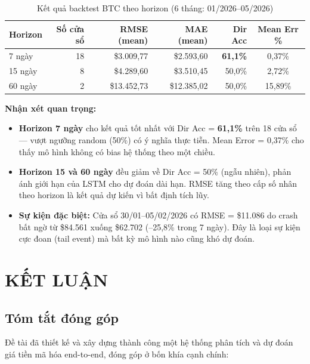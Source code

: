 \documentclass[12pt, a4paper]{report}
\begin{document}
\begin{table}[H]
  \centering
  \caption{Kết quả backtest BTC theo horizon (6 tháng: 01/2026--05/2026)}
  \label{tab:backtest}
  \begin{tabular}{lrrrrc}
    \toprule
    Horizon & Số cửa sổ & RMSE (mean) & MAE (mean) & Dir Acc & Mean Err \% \\
    \midrule
    7 ngày  & 18 & \$3.009,77 & \$2.593,60 & \textbf{61,1\%} & 0,37\% \\
    15 ngày & 8  & \$4.289,60 & \$3.510,45 & 50,0\%          & 2,72\% \\
    60 ngày & 2  & \$13.452,73 & \$12.385,02 & 50,0\%        & 15,89\% \\
    \bottomrule
  \end{tabular}
\end{table}

\textbf{Nhận xét quan trọng:}

\begin{itemize}
  \item \textbf{Horizon 7 ngày} cho kết quả tốt nhất với Dir Acc = \textbf{61,1\%} trên
    18 cửa sổ --- vượt ngưỡng random (50\%) có ý nghĩa thực tiễn. Mean Error = 0,37\%
    cho thấy mô hình không có bias hệ thống theo một chiều.

  \item \textbf{Horizon 15 và 60 ngày} đều giảm về Dir Acc = 50\% (ngẫu nhiên), phản ánh
    giới hạn của LSTM cho dự đoán dài hạn. RMSE tăng theo cấp số nhân theo horizon là
    kết quả dự kiến vì bất định tích lũy.

  \item \textbf{Sự kiện đặc biệt:} Cửa sổ 30/01--05/02/2026 có RMSE = \$11.086 do crash
    bất ngờ từ \$84.561 xuống \$62.702 (--25,8\% trong 7 ngày). Đây là loại sự kiện cực
    đoan (tail event) mà bất kỳ mô hình nào cũng khó dự đoán.
\end{itemize}

\chapter{KẾT LUẬN}

\section{Tóm tắt đóng góp}

Đề tài đã thiết kế và xây dựng thành công một hệ thống phân tích và dự đoán giá tiền
mã hóa end-to-end, đóng góp ở bốn khía cạnh chính:
\end{document}
